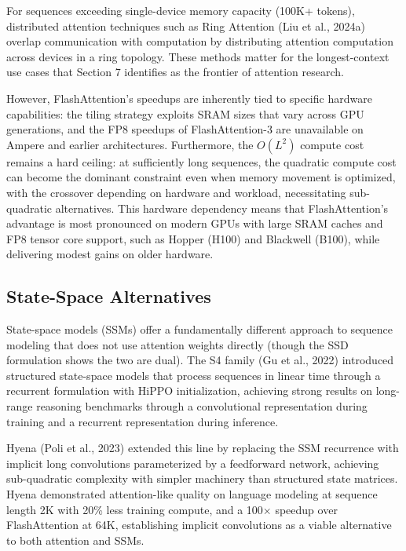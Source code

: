 \documentclass[10pt,twocolumn]{article}
\begin{document}
For sequences exceeding single-device memory capacity (100K+ tokens), distributed attention techniques such as Ring Attention (Liu et al., 2024a) overlap communication with computation by distributing attention computation across devices in a ring topology. These methods matter for the longest-context use cases that Section 7 identifies as the frontier of attention research.

However, FlashAttention's speedups are inherently tied to specific hardware capabilities: the tiling strategy exploits SRAM sizes that vary across GPU generations, and the FP8 speedups of FlashAttention-3 are unavailable on Ampere and earlier architectures. Furthermore, the $O(L^2)$ compute cost remains a hard ceiling: at sufficiently long sequences, the quadratic compute cost can become the dominant constraint even when memory movement is optimized, with the crossover depending on hardware and workload, necessitating sub-quadratic alternatives. This hardware dependency means that FlashAttention's advantage is most pronounced on modern GPUs with large SRAM caches and FP8 tensor core support, such as Hopper (H100) and Blackwell (B100), while delivering modest gains on older hardware.

\subsection{State-Space Alternatives}\label{state-space-alternatives}

State-space models (SSMs) offer a fundamentally different approach to sequence modeling that does not use attention weights directly (though the SSD formulation shows the two are dual). The S4 family (Gu et al., 2022) introduced structured state-space models that process sequences in linear time through a recurrent formulation with HiPPO initialization, achieving strong results on long-range reasoning benchmarks through a convolutional representation during training and a recurrent representation during inference.

Hyena (Poli et al., 2023) extended this line by replacing the SSM recurrence with implicit long convolutions parameterized by a feedforward network, achieving sub-quadratic complexity with simpler machinery than structured state matrices. Hyena demonstrated attention-like quality on language modeling at sequence length 2K with 20\% less training compute, and a 100$\times$ speedup over FlashAttention at 64K, establishing implicit convolutions as a viable alternative to both attention and SSMs.
\end{document}
